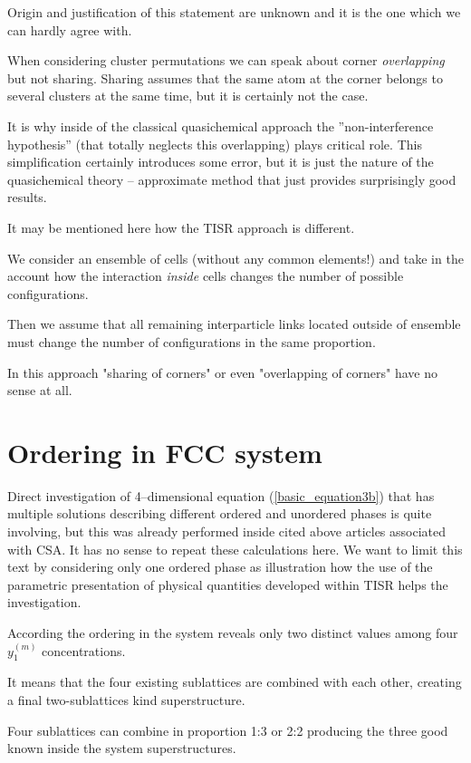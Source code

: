 \documentclass[12pt,abstract]{scrartcl}
\let\ce\ch
\begin{document}
Origin and justification of this statement are unknown and it is the one which we can hardly agree with.

When considering cluster permutations we can speak about corner \textit{overlapping} but not sharing.
Sharing assumes that the same atom at the corner belongs to several clusters at the same time, but it is certainly not the case.

It is why inside of the classical quasichemical approach the  ”non-interference hypothesis” \cite{GUGGENHEIM1952} (that totally neglects this overlapping) plays critical role.
This simplification certainly introduces some error, but it is just the nature of the quasichemical theory -- approximate method that just provides surprisingly good results.

It may be mentioned here how the TISR approach \cite{TISR_p1} is different.

We consider an ensemble of cells (without any common elements!) and take in the account how the interaction \textit{inside} cells changes the number of possible configurations.

Then we assume that all remaining interparticle links located outside of ensemble must change the number of configurations in the same proportion.

In this approach "sharing of corners" or even "overlapping of corners" have no sense at all.


\section{Ordering in FCC system}

Direct investigation of 4--dimensional equation (\ref{basic_equation3b}) that has multiple solutions describing  different ordered and unordered phases is quite involving, but this was already performed inside  cited above articles associated with CSA.
It has no sense to repeat these calculations here.
We want to limit this text by considering only one ordered phase as illustration how the use of the parametric presentation of physical quantities developed within TISR helps the investigation.

According \cite{Cao2007}  the ordering in  the \ce{Au-Cu} system reveals only two distinct values among four $y_1^{(m)}$ concentrations.

It means that the four existing sublattices are combined with each other, creating a final two-sublattices kind superstructure.

Four sublattices can combine in proportion 1:3 or 2:2 producing the three good known inside  the \ce{Au-Cu} system superstructures.
\end{document}
